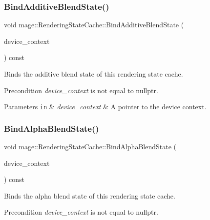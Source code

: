 \subsubsection{\texorpdfstring{Bind\+Additive\+Blend\+State()}{BindAdditiveBlendState()}}
{\footnotesize\ttfamily void mage\+::\+Rendering\+State\+Cache\+::\+Bind\+Additive\+Blend\+State (\begin{DoxyParamCaption}\item[{I\+D3\+D11\+Device\+Context2 $\ast$}]{device\+\_\+context }\end{DoxyParamCaption}) const\hspace{0.3cm}{\ttfamily [noexcept]}}

Binds the additive blend state of this rendering state cache.

\begin{DoxyPrecond}{Precondition}
{\itshape device\+\_\+context} is not equal to {\ttfamily nullptr}. 
\end{DoxyPrecond}

\begin{DoxyParams}[1]{Parameters}
\mbox{\tt in}  & {\em device\+\_\+context} & A pointer to the device context. \\
\hline
\end{DoxyParams}
\hypertarget{structmage_1_1_rendering_state_cache_a576da855238a9bfb03ecbb266e870d05}{}\label{structmage_1_1_rendering_state_cache_a576da855238a9bfb03ecbb266e870d05} 
\subsubsection{\texorpdfstring{Bind\+Alpha\+Blend\+State()}{BindAlphaBlendState()}}
{\footnotesize\ttfamily void mage\+::\+Rendering\+State\+Cache\+::\+Bind\+Alpha\+Blend\+State (\begin{DoxyParamCaption}\item[{I\+D3\+D11\+Device\+Context2 $\ast$}]{device\+\_\+context }\end{DoxyParamCaption}) const\hspace{0.3cm}{\ttfamily [noexcept]}}

Binds the alpha blend state of this rendering state cache.

\begin{DoxyPrecond}{Precondition}
{\itshape device\+\_\+context} is not equal to {\ttfamily nullptr}. 
\end{DoxyPrecond}

